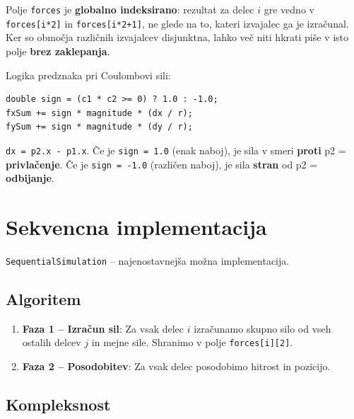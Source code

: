 \documentclass[12pt,a4paper]{article}
\begin{document}
\begin{kljucno}
Polje \texttt{forces} je \textbf{globalno indeksirano}: rezultat za delec $i$ gre vedno v \texttt{forces[i*2]} in \texttt{forces[i*2+1]}, ne glede na to, kateri izvajalec ga je izra\v{c}unal. Ker so obmo\v{c}ja razli\v{c}nih izvajalcev disjunktna, lahko ve\v{c} niti hkrati pi\v{s}e v isto polje \textbf{brez zaklepanja}.
\end{kljucno}

Logika predznaka pri Coulombovi sili:
\begin{lstlisting}
double sign = (c1 * c2 >= 0) ? 1.0 : -1.0;
fxSum += sign * magnitude * (dx / r);
fySum += sign * magnitude * (dy / r);
\end{lstlisting}

\begin{kljucno}
\texttt{dx = p2.x - p1.x}. \v{C}e je \texttt{sign = 1.0} (enak naboj), je sila v smeri \textbf{proti} p2 = \textbf{privla\v{c}enje}. \v{C}e je \texttt{sign = -1.0} (razli\v{c}en naboj), je sila \textbf{stran} od p2 = \textbf{odbijanje}.
\end{kljucno}

\section{Sekvencna implementacija}

\texttt{SequentialSimulation} -- najenostavnej\v{s}a mo\v{z}na implementacija.

\subsection{Algoritem}

\begin{enumerate}
    \item \textbf{Faza 1 -- Izra\v{c}un sil}: Za vsak delec $i$ izra\v{c}unamo skupno silo od vseh ostalih delcev $j$ in mejne sile. Shranimo v polje \texttt{forces[i][2]}.
    \item \textbf{Faza 2 -- Posodobitev}: Za vsak delec posodobimo hitrost in pozicijo.
\end{enumerate}

\subsection{Kompleksnost}
\end{document}
